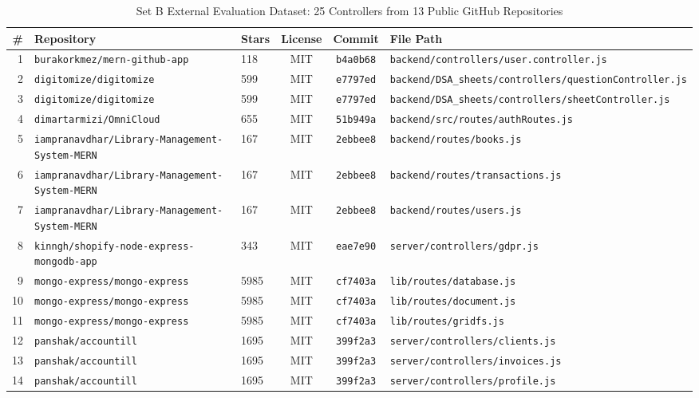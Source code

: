 \begin{table}[t]
\centering
\caption{Set B External Evaluation Dataset: 25 Controllers from 13 Public GitHub Repositories}
\label{tab:external_manifest}
\begin{tabular}{rllccl}
\toprule
\textbf{\#} & \textbf{Repository} & \textbf{Stars} & \textbf{License} & \textbf{Commit} & \textbf{File Path} \\
\midrule
1 & \texttt{burakorkmez/mern-github-app} & 118 & MIT & \texttt{b4a0b68} & \texttt{backend/controllers/user.controller.js} \\
2 & \texttt{digitomize/digitomize} & 599 & MIT & \texttt{e7797ed} & \texttt{backend/DSA\_sheets/controllers/questionController.js} \\
3 & \texttt{digitomize/digitomize} & 599 & MIT & \texttt{e7797ed} & \texttt{backend/DSA\_sheets/controllers/sheetController.js} \\
4 & \texttt{dimartarmizi/OmniCloud} & 655 & MIT & \texttt{51b949a} & \texttt{backend/src/routes/authRoutes.js} \\
5 & \texttt{iampranavdhar/Library-Management-System-MERN} & 167 & MIT & \texttt{2ebbee8} & \texttt{backend/routes/books.js} \\
6 & \texttt{iampranavdhar/Library-Management-System-MERN} & 167 & MIT & \texttt{2ebbee8} & \texttt{backend/routes/transactions.js} \\
7 & \texttt{iampranavdhar/Library-Management-System-MERN} & 167 & MIT & \texttt{2ebbee8} & \texttt{backend/routes/users.js} \\
8 & \texttt{kinngh/shopify-node-express-mongodb-app} & 343 & MIT & \texttt{eae7e90} & \texttt{server/controllers/gdpr.js} \\
9 & \texttt{mongo-express/mongo-express} & 5985 & MIT & \texttt{cf7403a} & \texttt{lib/routes/database.js} \\
10 & \texttt{mongo-express/mongo-express} & 5985 & MIT & \texttt{cf7403a} & \texttt{lib/routes/document.js} \\
11 & \texttt{mongo-express/mongo-express} & 5985 & MIT & \texttt{cf7403a} & \texttt{lib/routes/gridfs.js} \\
12 & \texttt{panshak/accountill} & 1695 & MIT & \texttt{399f2a3} & \texttt{server/controllers/clients.js} \\
13 & \texttt{panshak/accountill} & 1695 & MIT & \texttt{399f2a3} & \texttt{server/controllers/invoices.js} \\
14 & \texttt{panshak/accountill} & 1695 & MIT & \texttt{399f2a3} & \texttt{server/controllers/profile.js} \\

\end{tabular}
\end{table}
